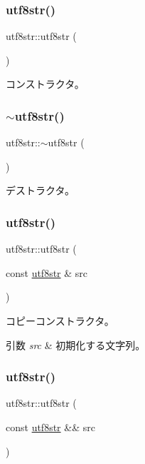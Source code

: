 \subsubsection{\texorpdfstring{utf8str()}{utf8str()}\hspace{0.1cm}{\footnotesize\ttfamily [1/4]}}
{\footnotesize\ttfamily utf8str\+::utf8str (\begin{DoxyParamCaption}{ }\end{DoxyParamCaption})}

コンストラクタ。 \hypertarget{classutf8str_a996c3bcff1a049ff834da89b6d02eda5}{}\label{classutf8str_a996c3bcff1a049ff834da89b6d02eda5} 
\subsubsection{\texorpdfstring{$\sim$utf8str()}{~utf8str()}}
{\footnotesize\ttfamily utf8str\+::$\sim$utf8str (\begin{DoxyParamCaption}{ }\end{DoxyParamCaption})\hspace{0.3cm}{\ttfamily [virtual]}}

デストラクタ。 \hypertarget{classutf8str_aa91e798ecc3f4da99961ab204c35bcb9}{}\label{classutf8str_aa91e798ecc3f4da99961ab204c35bcb9} 
\subsubsection{\texorpdfstring{utf8str()}{utf8str()}\hspace{0.1cm}{\footnotesize\ttfamily [2/4]}}
{\footnotesize\ttfamily utf8str\+::utf8str (\begin{DoxyParamCaption}\item[{const \hyperlink{classutf8str}{utf8str} \&}]{src }\end{DoxyParamCaption})}

コピーコンストラクタ。 
\begin{DoxyParams}{引数}
{\em src} & 初期化する文字列。 \\
\hline
\end{DoxyParams}
\hypertarget{classutf8str_abdde62e19811801c54236bb7d8322177}{}\label{classutf8str_abdde62e19811801c54236bb7d8322177} 
\subsubsection{\texorpdfstring{utf8str()}{utf8str()}\hspace{0.1cm}{\footnotesize\ttfamily [3/4]}}
{\footnotesize\ttfamily utf8str\+::utf8str (\begin{DoxyParamCaption}\item[{const \hyperlink{classutf8str}{utf8str} \&\&}]{src }\end{DoxyParamCaption})\hspace{0.3cm}{\ttfamily [delete]}}

